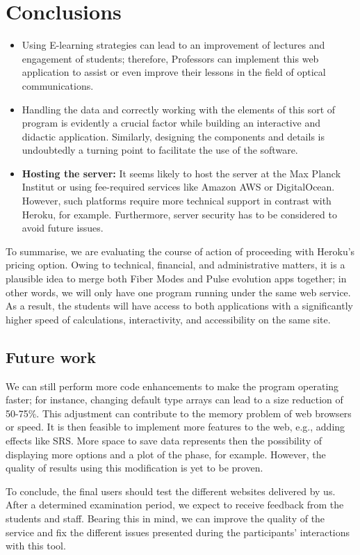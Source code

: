 \chapter{Conclusions}
\begin{itemize}
    \item Using E-learning strategies can lead to an improvement of lectures and engagement of students; therefore, Professors can implement this web application to assist or even improve their lessons in the field of optical communications. 
    \item Handling the data and correctly working with the elements of this sort of program is evidently a crucial factor while building an interactive and didactic application. Similarly, designing the components and details is undoubtedly a turning point to facilitate the use of the software.
    
    \item \textbf{Hosting the server:} It seems likely to host the server at the Max Planck Institut or using fee-required services like Amazon AWS or DigitalOcean. However, such platforms require more technical support in contrast with Heroku, for example. Furthermore, server security has to be considered to avoid future issues.
\end{itemize}

To summarise, we are evaluating the course of action of proceeding with Heroku's pricing option. Owing to technical, financial, and administrative matters, it is a plausible idea to merge both Fiber Modes and Pulse evolution apps together; in other words, we will only have one program running under the same web service. As a result, the students will have access to both applications with a significantly higher speed of calculations, interactivity, and accessibility on the same site.
    
    
\section{Future work}


    We can still perform more code enhancements to make the program operating faster; for instance, changing default type arrays can lead to a size reduction of 50-75\%. This adjustment can contribute to the memory problem of web browsers or speed. It is then feasible to implement more features to the web, e.g., adding effects like SRS. More space to save data represents then the possibility of displaying more options and a plot of the phase, for example. However, the quality of results using this modification is yet to be proven.
    
    
    To conclude, the final users should test the different websites delivered by us. After a determined examination period, we expect to receive feedback from the students and staff. Bearing this in mind, we can improve the quality of the service and fix the different issues presented during the participants' interactions with this tool.